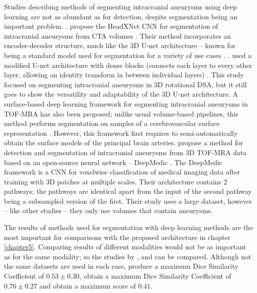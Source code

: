 Studies describing methods of segmenting intracranial aneurysms using deep learning are not as abundant as for detection, despite segmentation being an important problem. . \citeauthor{Park2019} propose the HeadXNet CNN for segmentation of intracranial aneurysms from CTA volumes \cite{Park2019}. Their method incorporates an encoder-decoder structure, much like the 3D U-net architecture -- known for being a standard model used for segmentation for a variety of use cases \cite{3dunet}. . \citeauthor{Liu2021} used a modified U-net architecture with dense blocks (connects each layer to every other layer, allowing an identity transform in between individual layers) \cite{Liu2021}. This study focused on segmenting intracranial aneurysms in 3D rotational DSA, but it still goes to show the versatility and adaptability  of the 3D U-net architecture. A surface-based deep learning framework for segmenting intracranial aneurysms in TOF-MRA has also been proposed; unlike usual volume-based pipelines, this method performs segmentation on samples of a cerebrovascular surface representation \cite{Yang2020}. However, this framework first requires to semi-automatically obtain the surface models of the principal brain arteries. \citeauthor{Sichermann2019} propose a method for detection and segmentation of intracranial aneurysms from 3D TOF-MRA data based on an open-source neural network --  DeepMedic \cite{Sichermann2019}. The DeepMedic framework is a CNN for voxelwise classification of medical imaging data after training with 3D patches at multiple scales. Their architecture contains 2 pathways; the pathways are identical apart from the input of the second pathway being a subsampled version of the first. Their study uses a large dataset, however -- like other studies -- they only use volumes that contain aneurysms. 

The results of methods used for segmentation with deep learning methods are the most important for comparisons with the proposed architecture in chapter \ref{chapter5}. Comparing results of different modalities would not be as important as for the same modality; so the studies by \citeauthor{Yang2020}, \citeauthor{Sichermann2019} and  can be compared. Although not the same datasets are used in each case, \citeauthor{Sichermann2019} produce a maximum Dice Similarity Coefficient of $0.53 \pm 0.30$, \citeauthor{Yang2020} obtain a maximum Dice Similarity Coefficient of $0.76 \pm 0.27$ and  obtain a maximum score of $0.41$. 













